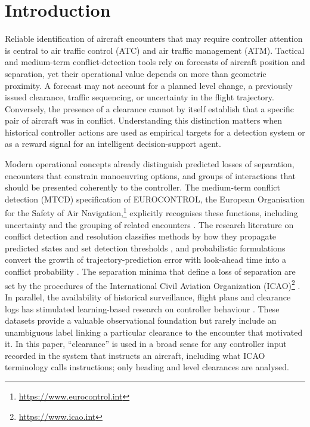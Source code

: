 \documentclass[aerospace,article,submit,moreauthors]{Definitions/mdpi}
\begin{document}
\section{Introduction}
\label{sec:intro}
Reliable identification of aircraft encounters that may require controller attention is central to air traffic control (ATC) and air traffic management (ATM). Tactical and medium-term conflict-detection tools rely on forecasts of aircraft position and separation, yet their operational value depends on more than geometric proximity. A forecast may not account for a planned level change, a previously issued clearance, traffic sequencing, or uncertainty in the flight trajectory. Conversely, the presence of a clearance cannot by itself establish that a specific pair of aircraft was in conflict. Understanding this distinction matters when historical controller actions are used as empirical targets for a detection system or as a reward signal for an intelligent decision-support agent.

Modern operational concepts already distinguish predicted losses of separation, encounters that constrain manoeuvring options, and groups of interactions that should be presented coherently to the controller. The medium-term conflict detection (MTCD) specification of EUROCONTROL, the European Organisation for the Safety of Air Navigation,\footnote{\url{https://www.eurocontrol.int}} explicitly recognises these functions, including uncertainty and the grouping of related encounters \cite{eurocontrol2017}. The research literature on conflict detection and resolution classifies methods by how they propagate predicted states and set detection thresholds \cite{kuchar2000}, and probabilistic formulations convert the growth of trajectory-prediction error with look-ahead time into a conflict probability \cite{paielli1997,prandini2000}. The separation minima that define a loss of separation are set by the procedures of the International Civil Aviation Organization (ICAO)\footnote{\url{https://www.icao.int}} \cite{icao4444}. In parallel, the availability of historical surveillance, flight plans and clearance logs has stimulated learning-based research on controller behaviour \cite{bastas2022,bastas2023,delgado2022}. These datasets provide a valuable observational foundation but rarely include an unambiguous label linking a particular clearance to the encounter that motivated it. In this paper, ``clearance'' is used in a broad sense for any controller input recorded in the system that instructs an aircraft, including what ICAO terminology calls instructions; only heading and level clearances are analysed.
\end{document}

